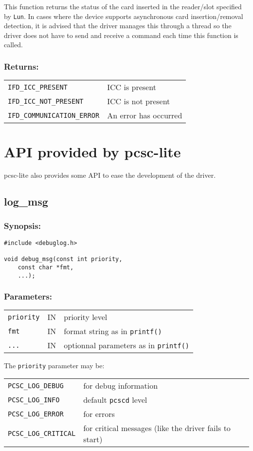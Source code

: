 \documentclass[a4paper,12pt]{article}
\newcommand{\synopsis}{\subsubsection{Synopsis:}}
\newcommand{\parameters}{\subsubsection{Parameters:}}
\newcommand{\returns}{\subsubsection{Returns:}}
\begin{document}
This function returns the status of the card inserted in the reader/slot
specified by \texttt{Lun}. In cases where the device supports
asynchronous card insertion/removal detection, it is advised that the
driver manages this through a thread so the driver does not have to send
and receive a command each time this function is called.

\returns

\begin{tabular}{ll}
\texttt{IFD\_ICC\_PRESENT} & ICC is present\\
\texttt{IFD\_ICC\_NOT\_PRESENT} & ICC is not present\\
\texttt{IFD\_COMMUNICATION\_ERROR} & An error has occurred
\end{tabular}


\section{API provided by pcsc-lite}

pcsc-lite also provides some API to ease the development of the driver.


\subsection{log\_msg}

\synopsis
\begin{verbatim}
#include <debuglog.h>

void debug_msg(const int priority,
    const char *fmt,
    ...);
\end{verbatim}

\parameters

\begin{tabular}{lll}
\texttt{priority} & IN & priority level \\
\texttt{fmt} & IN & format string as in \texttt{printf()} \\
\texttt{...} & IN & optionnal parameters as in \texttt{printf()} \\
\end{tabular}

The \texttt{priority} parameter may be:

\begin{tabular}{ll}
\texttt{PCSC\_LOG\_DEBUG} & for debug information \\
\texttt{PCSC\_LOG\_INFO} & default \texttt{pcscd} level \\
\texttt{PCSC\_LOG\_ERROR} & for errors \\
\texttt{PCSC\_LOG\_CRITICAL} & for critical messages (like the driver
fails to start) \\
\end{tabular}
\end{document}
